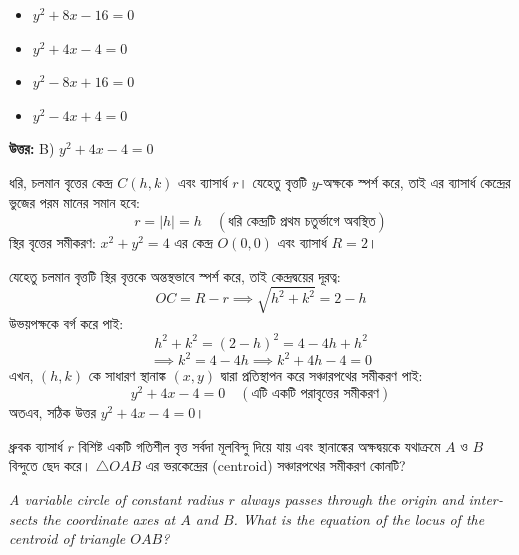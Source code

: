 \documentclass[12pt, a4paper]{article}
\begin{document}
\begin{itemize}[label={}, leftmargin=1cm, itemsep=0.5em]
    \item[\textbf{A)}] $y^2 + 8x - 16 = 0$
    \item[\textbf{B)}] $y^2 + 4x - 4 = 0$
    \item[\textbf{C)}] $y^2 - 8x + 16 = 0$
    \item[\textbf{D)}] $y^2 - 4x + 4 = 0$
\end{itemize}

\vspace{0.5em}
\begin{tcolorbox}[answerbox]
    \textbf{\color{success} উত্তর:} B) $y^2 + 4x - 4 = 0$
\end{tcolorbox}
\vspace{1em}

\begin{tcolorbox}[solutionbox={সমাধান (Solution)}]
    \noindent
    ধরি, চলমান বৃত্তের কেন্দ্র $C(h, k)$ এবং ব্যাসার্ধ $r$। যেহেতু বৃত্তটি $y$-অক্ষকে স্পর্শ করে, তাই এর ব্যাসার্ধ কেন্দ্রের ভুজের পরম মানের সমান হবে:
    \[ r = |h| = h \quad (\text{ধরি কেন্দ্রটি প্রথম চতুর্ভাগে অবস্থিত}) \]
    স্থির বৃত্তের সমীকরণ: $x^2 + y^2 = 4$ এর কেন্দ্র $O(0, 0)$ এবং ব্যাসার্ধ $R = 2$। 
    
    \vspace{0.5em}
    যেহেতু চলমান বৃত্তটি স্থির বৃত্তকে অন্তস্থভাবে স্পর্শ করে, তাই কেন্দ্রদ্বয়ের দূরত্ব:
    \[ OC = R - r \implies \sqrt{h^2 + k^2} = 2 - h \]
    উভয়পক্ষকে বর্গ করে পাই:
    \[ h^2 + k^2 = (2 - h)^2 = 4 - 4h + h^2 \]
    \[ \implies k^2 = 4 - 4h \implies k^2 + 4h - 4 = 0 \]
    এখন, $(h, k)$ কে সাধারণ স্থানাঙ্ক $(x, y)$ দ্বারা প্রতিস্থাপন করে সঞ্চারপথের সমীকরণ পাই:
    \[ y^2 + 4x - 4 = 0 \quad (\text{এটি একটি পরাবৃত্তের সমীকরণ}) \]
    অতএব, সঠিক উত্তর $y^2 + 4x - 4 = 0$।
\end{tcolorbox}

\begin{tcolorbox}[questionbox={প্রশ্ন (Question) 32}]
    \noindent
    ধ্রুবক ব্যাসার্ধ $r$ বিশিষ্ট একটি গতিশীল বৃত্ত সর্বদা মূলবিন্দু দিয়ে যায় এবং স্থানাঙ্কের অক্ষদ্বয়কে যথাক্রমে $A$ ও $B$ বিন্দুতে ছেদ করে। $\triangle OAB$ এর ভরকেন্দ্রের (centroid) সঞ্চারপথের সমীকরণ কোনটি?
    
    \vspace{0.8em}
    \begin{english}
    \noindent\textit{\color{darkgray}
    A variable circle of constant radius $r$ always passes through the origin and intersects the coordinate axes at $A$ and $B$. What is the equation of the locus of the centroid of triangle $OAB$?
    }
    \end{english}
\end{tcolorbox}
\end{document}

